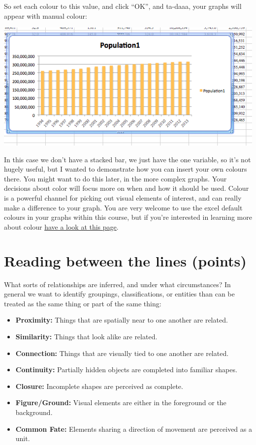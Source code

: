 \documentclass[]{book}
\providecommand{\tightlist}{%
  \setlength{\itemsep}{0pt}\setlength{\parskip}{0pt}}
\theoremstyle{definition}
\theoremstyle{definition}
\theoremstyle{definition}
\theoremstyle{remark}
\begin{document}
So set each colour to this value, and click ``OK'', and ta-daaa, your
graphs will appear with manual colour:

\includegraphics{imgs/manual_fill_6.png}

In this case we don't have a stacked bar, we just have the one variable,
so it's not hugely useful, but I wanted to demonstrate how you can
insert your own colours there. You might want to do this later, in the
more complex graphs. Your decisions about color will focus more on when
and how it should be used. Colour is a powerful channel for picking out
visual elements of interest, and can really make a difference to your
graph. You are very welcome to use the excel default colours in your
graphs within this course, but if you're interested in learning more
about colour
\href{https://lisacharlotterost.github.io/2016/04/22/Colors-for-DataVis/}{have
a look at this page}.

\hypertarget{reading-between-the-lines-points}{%
\section{Reading between the lines
(points)}\label{reading-between-the-lines-points}}

What sorts of relationships are inferred, and under what circumstances?
In general we want to identify groupings, classifications, or entities
than can be treated as the same thing or part of the same thing:

\begin{itemize}
\tightlist
\item
  \textbf{Proximity:} Things that are spatially near to one another are
  related.
\item
  \textbf{Similarity:} Things that look alike are related.
\item
  \textbf{Connection:} Things that are visually tied to one another are
  related.
\item
  \textbf{Continuity:} Partially hidden objects are completed into
  familiar shapes.
\item
  \textbf{Closure:} Incomplete shapes are perceived as complete.
\item
  \textbf{Figure/Ground:} Visual elements are either in the foreground
  or the background.
\item
  \textbf{Common Fate:} Elements sharing a direction of movement are
  perceived as a unit.
\end{itemize}
\end{document}
